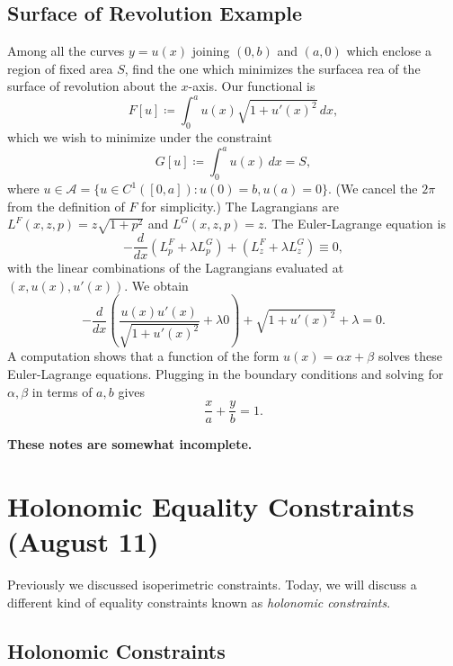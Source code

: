 \documentclass[11pt]{book}
\begin{document}
\subsection{Surface of Revolution Example}

Among all the curves $y = u(x)$ joining $(0, b)$ and $(a, 0)$ which enclose a region of fixed area $S$, find the one which minimizes the surfacea rea of the surface of revolution about the $x$-axis. Our functional is
\[
F[u] \coloneqq \int_0^a  u(x) \sqrt{1 + u'(x)^2} \, dx,
\]
which we wish to minimize under the constraint
\[
G[u] \coloneqq \int_0^a u(x) \, dx = S,
\]
where $u \in \mathcal{A} = \{ u \in C^1([0, a]) : u(0) = b, u(a) = 0 \}$. (We cancel the $2\pi$ from the definition of $F$ for simplicity.) The Lagrangians are $L^F(x,z,p) = z\sqrt{1 + p^2}$ and $L^G(x,z,p) = z$. The Euler-Lagrange equation is
\[
-\frac{d}{dx} (L^F_p + \lambda L^G_p) + (L^F_z + \lambda L^G_z) \equiv 0,
\]
with the linear combinations of the Lagrangians evaluated at $(x, u(x), u'(x))$. We obtain
\[
-\frac{d}{dx} \left( \frac{u(x)u'(x)}{\sqrt{1 + u'(x)^2}} + \lambda 0 \right) + \sqrt{1 + u'(x)^2} + \lambda = 0.
\]
A computation shows that a function of the form $u(x) = \alpha x + \beta$ solves these Euler-Lagrange equations. Plugging in the boundary conditions and solving for $\alpha, \beta$ in terms of $a, b$ gives
\[
\frac{x}{a} + \frac{y}{b} = 1.
\]

\textbf{These notes are somewhat incomplete.}

\newpage

\section{Holonomic Equality Constraints (August 11)}

Previously we discussed isoperimetric constraints. Today, we will discuss a different kind of equality constraints known as \emph{holonomic constraints}.

\subsection{Holonomic Constraints}
\end{document}
